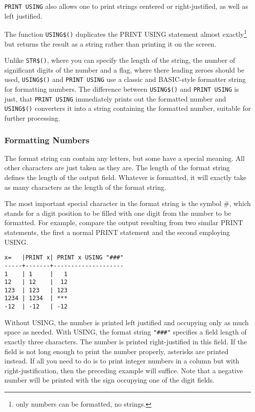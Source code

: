 \verb|PRINT USING| also allows one to print strings centered or right-justified, as
well as left justified.

The function \verb|USING$()| duplicates the PRINT USING statement almost 
exactly\footnote{only numbers can be formatted, no strings.} but returns the 
result as a string rather than printing it on the screen. 

Unlike \verb|STR$()|, where you can specify the length of the string, the
number of significant digits of the number and a flag, where there leading zeroes
should be used, \verb|USING$()| and \verb|PRINT USING| use a classic and
BASIC-style formatter string for formatting numbers. The difference between
\verb|USING$()| and \verb|PRINT USING| is just, that \verb|PRINT USING|
immediately prints out the formatted number and \verb|USING$()| converters it
into a string containing the formatted number, suitable for further processing.

\subsubsection*{Formatting Numbers}

The format string can contain any letters, but some have a special meaning. 
All other characters are just taken as they are. The length of the format 
string defines the length of the output field. Whatever is formatted, it 
will exactly take as many characters as the length of the format string. 

The most important special character in the format string is the symbol \#,
which stands for a digit position to be filled with one digit from the number
to be formatted. For example, compare the output resulting from two similar
PRINT statements, the first a normal PRINT statement and the second employing
USING.

\begin{verbatim}
x=   |PRINT x| PRINT x USING "###"
-----+-------+--------------------
1    | 1     |   1
12   | 12    |  12
123  | 123   | 123
1234 | 1234  | ***
-12  | -12   | -12
\end{verbatim}

Without USING, the number is printed left justified and occupying only as much 
space as needed.
With USING, the format string \verb|"###"| specifies a field length of exactly
three characters. The number is printed right-justified in this field. If the
field is not long enough to print the number properly, asterisks are printed
instead. If all you need to do is to print integer numbers in a column but with
right-justification, then the preceding example will suffice. Note that a 
negative number will be printed with the sign occupying one of the digit fields.

